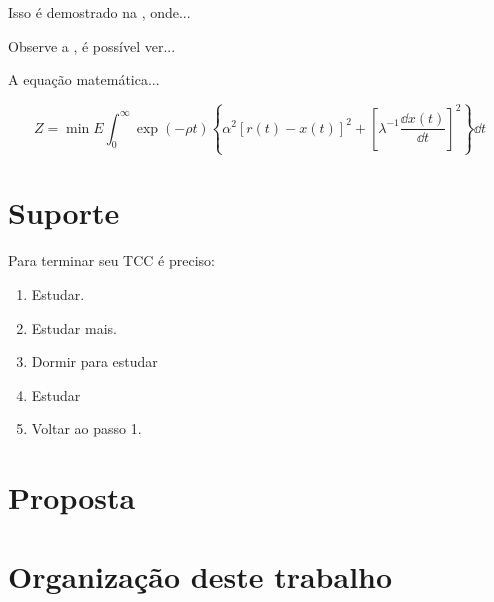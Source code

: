 Isso é demostrado na , onde...

Observe a , é possível ver...

A equação matemática...

\begin{equation}
Z=\min E \int_{0}^{\infty} \exp(-\rho t)\left\{ \alpha^2[r(t)-x(t)]^2+
  \left[\lambda ^ {-1}\frac{\dd{x(t)}}{\dd{t}}\right]^2 \right\} \dd{t}
\end{equation}

 \section{Suporte}
Para terminar seu TCC é preciso:

\begin{enumerate}
  \item Estudar.
  \item Estudar mais.
  \item Dormir para estudar
  \item Estudar
  \item Voltar ao passo 1.
\end{enumerate}

\section{Proposta}
\lipsum[2-2]



\section{Organização deste trabalho}

\lipsum[2-2]
